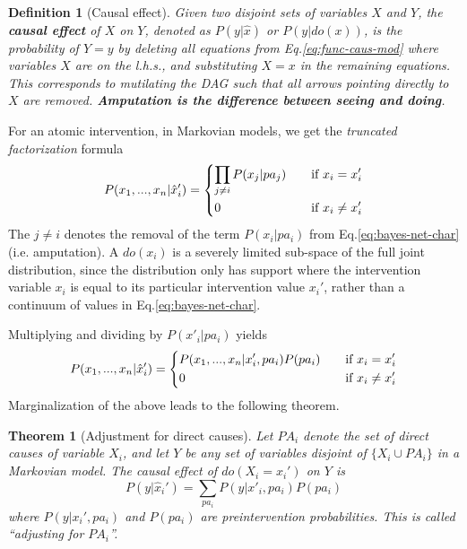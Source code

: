 \documentclass[11pt]{article}
\numberwithin{equation}{section}
\newtheorem{thm}{Theorem}[section]
\newtheorem{defn}{Definition}[section]
\begin{document}
\begin{defn}[Causal effect]
Given two disjoint sets of variables $X$ and $Y$, the \textbf{causal effect} of $X$ on $Y$, denoted as $P(y|\hat{x})$ or $P(y|do(x))$, is the probability of $Y=y$ by deleting all equations from Eq.\eqref{eq:func-caus-mod} where variables $X$ are on the l.h.s., and substituting $X=x$ in the remaining equations. This corresponds to mutilating the DAG such that all arrows pointing directly to $X$ are removed. \textbf{Amputation is the difference between seeing and doing}.
\end{defn}

For an atomic intervention, in Markovian models, we get the \textit{truncated factorization} formula
\begin{equation}
P(x_1,...,x_n|\hat{x}'_i)=\begin{dcases}
\prod_{j\neq i} P(x_j|pa_j) \quad &\text{if}\ x_i = x_i'\\
0 &\text{if}\ x_i \neq x_i'
\end{dcases}
\end{equation}
The $j\neq i$ denotes the removal of the term $P(x_i|pa_i)$ from Eq.\eqref{eq:bayes-net-char} (i.e. amputation). A $do(x_i)$ is a severely limited sub-space of the full joint distribution, since the distribution only has support where the intervention variable $x_i$ is equal to its particular intervention value $x_i'$, rather than a continuum of values in Eq.\eqref{eq:bayes-net-char}.

Multiplying and dividing by $P(x'_i|pa_i)$ yields
\begin{equation}
P(x_1,...,x_n|\hat{x}'_i)=\begin{dcases}
P(x_1,...,x_n|x_i',pa_i)P(pa_i) \quad &\text{if}\ x_i = x_i'\\
0 &\text{if}\ x_i \neq x_i'
\end{dcases}
\end{equation}
Marginalization of the above leads to the following theorem.

\begin{thm}[Adjustment for direct causes]
Let $PA_i$ denote the set of direct causes of variable $X_i$, and let $Y$ be any set of variables disjoint of $\{X_i \cup PA_i \}$ in a Markovian model. The causal effect of $do(X_i=x_i')$ on $Y$ is
\begin{equation}
P(y|\hat{x}_i') = \sum_{pa_i} P(y | x'_i, pa_i) P(pa_i)
\end{equation}
where $P(y|x_i', pa_i)$ and $P(pa_i)$ are preintervention probabilities. This is called ``adjusting for $PA_i$''.
\end{thm}
\end{document}

